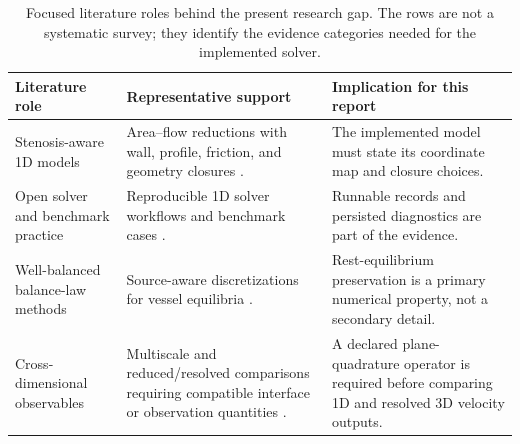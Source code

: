 \begin{table}[!htb]
    \centering
    \scriptsize
    \caption{Focused literature roles behind the present research gap. The rows
    are not a systematic survey; they identify the evidence categories needed for
    the implemented solver.}
    \label{tab:sota-model-method-map}
    \begin{tabularx}{\textwidth}{@{}
        >{\raggedright\arraybackslash}p{}
        >{\raggedright\arraybackslash}p{}
        >{\raggedright\arraybackslash}X@{}}
        \toprule
        \textbf{Literature role} & \textbf{Representative support} & \textbf{Implication for this report} \\
        \midrule
        Stenosis-aware 1D models
            & Area--flow reductions with wall, profile, friction, and geometry
            closures
            \cite{FormaggiaEtAl2003OneDimensionalBloodFlow,CanicEtAl2024Extended1DStenosis}.
            & The implemented model must state its coordinate map and closure choices. \\
        Open solver and benchmark practice
            & Reproducible 1D solver workflows and benchmark cases
            \cite{BoileauEtAl2015Benchmark,BenemeritoEtAl2024OpenBF}.
            & Runnable records and persisted diagnostics are part of the evidence. \\
        Well-balanced balance-law methods
            & Source-aware discretizations for vessel equilibria
            \cite{LeVeque2002FiniteVolumeMethodsForHyperbolicProblems,PimentelGarciaEtAl2025HighOrderWellBalanced}.
            & Rest-equilibrium preservation is a primary numerical property, not a
            secondary detail. \\
        Cross-dimensional observables
            & Multiscale and reduced/resolved comparisons requiring compatible
            interface or observation quantities
            \cite{FormaggiaEtAl2007FSICoupling,QuarteroniVeneziani2003GeometricalMultiscale}.
            & A declared plane-quadrature operator is required before comparing 1D and
            resolved 3D velocity outputs. \\
        \bottomrule
    \end{tabularx}
\end{table}

